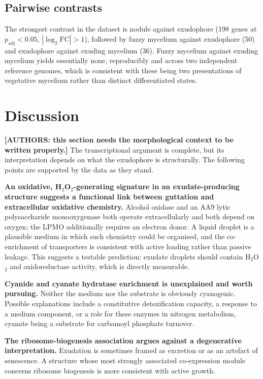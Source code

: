\subsection{Pairwise contrasts}

The strongest contrast in the dataset is nodule against exudophore (198 genes at
$p_{\mathrm{adj}}<0.05$, $|\log_2\mathrm{FC}|>1$), followed by fuzzy mycelium against
exudophore (50) and exudophore against exuding mycelium (36). Fuzzy mycelium against exuding
mycelium yields essentially none, reproducibly and across two independent reference genomes,
which is consistent with these being two presentations of vegetative mycelium rather than
distinct differentiated states.

\section{Discussion}

\noindent\textbf{[AUTHORS: this section needs the morphological context to be written
properly.]} The transcriptional argument is complete, but its interpretation depends on
what the exudophore is structurally. The following points are supported by the data as they
stand.

\textbf{An oxidative, H$_2$O$_2$-generating signature in an exudate-producing structure
suggests a functional link between guttation and extracellular oxidative chemistry.} Alcohol
oxidase and an AA9 lytic polysaccharide monooxygenase both operate extracellularly and both
depend on oxygen; the LPMO additionally requires an electron donor. A liquid droplet is a
plausible medium in which such chemistry could be organised, and the co-enrichment of
transporters is consistent with active loading rather than passive leakage. This suggests a
testable prediction: exudate droplets should contain H$_2$O$_2$ and oxidoreductase activity,
which is directly measurable.

\textbf{Cyanide and cyanate hydratase enrichment is unexplained and worth pursuing.} Neither
the medium nor the substrate is obviously cyanogenic. Possible explanations include a
constitutive detoxification capacity, a response to a medium component, or a role for these
enzymes in nitrogen metabolism, cyanate being a substrate for carbamoyl phosphate turnover.

\textbf{The ribosome-biogenesis association argues against a degenerative interpretation.}
Exudation is sometimes framed as excretion or as an artefact of senescence. A structure whose
most strongly associated co-expression module concerns ribosome biogenesis is more consistent
with active growth.

